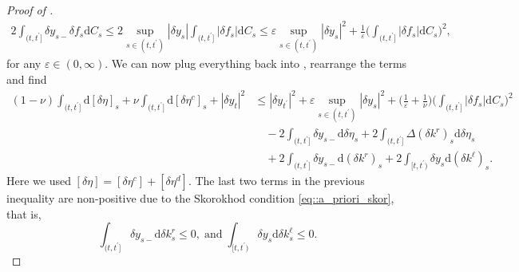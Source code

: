 \documentclass[10pt]{article} %
\def\d{\mathrm{d}}
\begin{document}
\begin{proof}[Proof of ]
\begin{align}\label{eq::delta_y_and_f}
	2\int_{(t,t^\prime]} \delta y_{s-} \delta f_s \d C_s \leq 2 \sup_{s \in (t,t^\prime)} |\delta y_s| \int_{(t,t^\prime]} |\delta f_s| \d C_s \leq \varepsilon \sup_{s \in (t,t^\prime)} |\delta y_s|^2 + \frac{1}{\varepsilon} \bigg(\int_{(t,t^\prime]} |\delta f_s| \d C_s\bigg)^2,
\end{align} 
for any $\varepsilon \in (0,\infty)$.
We can now plug everything back into , rearrange the terms and find
\begin{align}\label{eq::ineq_eta}
	(1-\nu) \int_{(t,t^\prime]} \d [\delta \eta]_s + \nu \int_{(t,t^\prime]} \d [\delta \eta^c]_s + |\delta y_t|^2
	&\leq |\delta y_{t^\prime}|^2 + \varepsilon \sup_{s \in (t,t^\prime)} |\delta y_s|^2 + \bigg(\frac{1}{\varepsilon} + \frac{1}{\nu}\bigg) \bigg( \int_{(t,t^\prime]} |\delta f_s| \d C_s \bigg)^2  \nonumber \\
	&\quad - 2 \int_{(t,t^\prime]} \delta y_{s-} \d \delta \eta_s + 2\int_{(t,t^\prime]} \Delta (\delta k^r)_s \d \delta \eta_s \nonumber\\
	&\quad + 2 \int_{(t,t^\prime]} \delta y_{s-} \d (\delta k^r)_s + 2 \int_{[t,t^\prime)} \delta y_s \d (\delta k^\ell)_s.
\end{align}
Here we used $[\delta \eta] = [\delta \eta^c] + [\delta \eta^d]$. The last two terms in the previous inequality are non-positive due to the Skorokhod condition \eqref{eq::a_priori_skor}, that is,
\begin{equation}\label{eq::skorokhod_for_delta_y}
	\int_{(t,t^\prime]}\delta y_{s-} \d \delta k^r_s \leq 0, \; \text{and} \; \int_{[t,t^\prime)}\delta y_{s} \d \delta k^\ell_s \leq 0.
\end{equation}






\end{proof}
\end{document}
